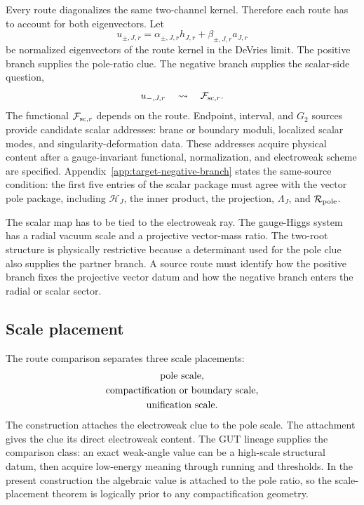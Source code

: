 Every route diagonalizes the same two-channel kernel.  Therefore each route has to account for both eigenvectors.  Let
\begin{equation}
  u_{\pm,J,r}=
  \alpha_{\pm,J,r}h_{J,r}
  +
  \beta_{\pm,J,r}a_{J,r}
  \label{eq:route-eigenvectors}
\end{equation}
be normalized eigenvectors of the route kernel in the DeVries limit.  The positive branch supplies the pole-ratio clue.  The negative branch supplies the scalar-side question,
\begin{equation}
  u_{-,J,r}
  \quad\leadsto\quad
  \mathcal F_{{\rm sc},r}.
  \label{eq:route-scalar-map}
\end{equation}
The functional \(\mathcal F_{{\rm sc},r}\) depends on the route.  Endpoint, interval, and \(G_2\) sources provide candidate scalar addresses: brane or boundary moduli, localized scalar modes, and singularity-deformation data.  These addresses acquire physical content after a gauge-invariant functional, normalization, and electroweak scheme are specified.
Appendix~\ref{app:target-negative-branch} states the same-source condition:
the first five entries of the scalar package must agree with the vector pole
package, including \(\mathcal H_J\), the inner product, the projection,
\(\Lambda_J\), and \(\mathcal R_{\rm pole}\).

The scalar map has to be tied to the electroweak ray.  The gauge-Higgs system has a radial vacuum scale and a projective vector-mass ratio.  The two-root structure is physically restrictive because a determinant used for the pole clue also supplies the partner branch.  A source route must identify how the positive branch fixes the projective vector datum and how the negative branch enters the radial or scalar sector.

\subsection{Scale placement}
\label{sec:route-scale-placement}

The route comparison separates three scale placements:
\begin{equation}
  \begin{gathered}
  \hbox{pole scale},
  \\
  \hbox{compactification or boundary scale},
  \\
  \hbox{unification scale}.
  \end{gathered}
  \label{eq:route-scale-placements}
\end{equation}
The construction attaches the electroweak clue to the pole scale.  The
attachment gives the clue its direct electroweak content.  The GUT lineage
supplies the comparison class: an exact weak-angle value can be a high-scale
structural datum, then acquire low-energy meaning through running and
thresholds.  In the present construction the algebraic value is attached to the pole
ratio, so the scale-placement theorem is logically prior to any compactification
geometry.

